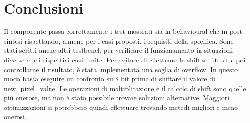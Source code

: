 \documentclass{article}
\begin{document}
\pagebreak

\section{Conclusioni}
Il componente passa correttamente i test mostrati sia in behavioural che in post sintesi rispettando, almeno per i casi proposti, i requisiti della specifica. Sono stati scritti anche altri testbench per verificare il funzionamento in situazioni diverse e nei rispettivi casi limite. Per evitare di effettuare lo shift su 16 bit e poi controllarne il risultato, è stata implementata una soglia di overflow. In questo modo basta eseguire un confronto su 8 bit prima di shiftare il valore di new\_pixel\_value. Le operazioni di moltiplicazione e il calcolo di shift sono quelle più onerose, ma non è stato possibile trovare soluzioni alternative. Maggiori ottimizzazioni si potrebbero quindi effettuare trovando metodi migliori e meno onerosi.

\printbibliography
\end{document}
